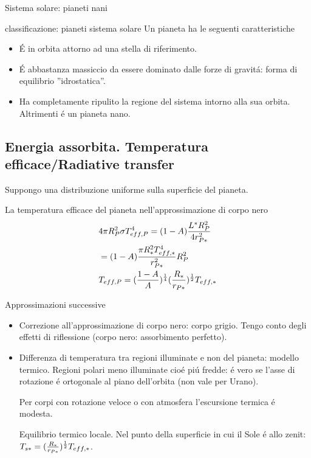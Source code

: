 \begin{frame}{Sistema solare: pianeti nani}
\end{frame}

\begin{wordonframe}{classificazione: pianeti sistema solare}
Un pianeta ha le seguenti caratteristiche
\begin{itemize}
    \item \'E in orbita attorno ad una stella di riferimento.
    \item \'E abbastanza massiccio da essere dominato dalle forze di gravit\'a: forma di equilibrio ''idrostatica''.
    \item Ha completamente ripulito la regione del sistema intorno alla sua orbita. Altrimenti \'e un pianeta nano.
\end{itemize}

\end{wordonframe}


\subsection{Energia assorbita. Temperatura efficace/Radiative transfer}

Suppongo una distribuzione uniforme sulla superficie del pianeta.

La temperatura efficace del pianeta nell'approssimazione di corpo nero
\begin{align*}
&4\pi R_P^2\sigma T_{eff,P}^4=(1-A)\frac{L^*R_P^2}{4r_{P*}^2}\\
&=(1-A)\frac{\pi R_*^2T_{eff,*}^4}{r_{P*}^2}R_P^2\\
&T_{eff,P}=(\frac{1-A}{A})^{\frac{1}{4}}(\frac{R_*}{r_{P*}})^{\frac{1}{2}}T_{eff,*}
\end{align*}

Approssimazioni successive
\begin{itemize}
    \item Correzione all'approssimazione di corpo nero: corpo grigio. Tengo conto degli effetti di riflessione (corpo nero: assorbimento perfetto).
    \item Differenza di temperatura tra regioni illuminate e non del pianeta: modello termico. Regioni polari meno illuminate cio\'e pi\'u fredde: \'e vero se l'asse di rotazione \'e ortogonale al piano dell'orbita (non vale per Urano).
    
    Per corpi con rotazione veloce o con atmosfera l'escursione termica \'e modesta.
    
    Equilibrio termico locale. Nel punto della superficie in cui il Sole \'e allo zenit: $T_{s*}=(\frac{R_*}{r_{P*}})^{\frac{1}{2}}T_{eff,*}$.
\end{itemize}
                